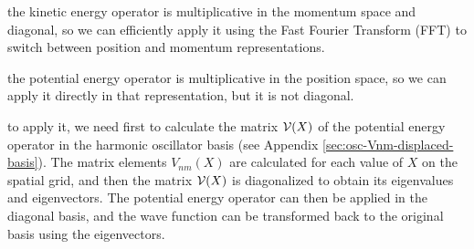the kinetic energy operator is multiplicative in the momentum space and diagonal, so we can efficiently apply it using the Fast Fourier Transform (FFT) to switch between position and momentum representations.

the potential energy operator is multiplicative in the position space, so we can apply it directly in that representation, but it is not diagonal.

to apply it, we need first to calculate the matrix ${\cal V}(X)$ of the potential energy operator in the harmonic oscillator basis (see Appendix \ref{sec:osc-Vnm-displaced-basis}). The matrix elements $V_{nm}(X)$ are calculated for each value of $X$ on the spatial grid, and then the matrix ${\cal V}(X)$ is diagonalized to obtain its eigenvalues and eigenvectors. The potential energy operator can then be applied in the diagonal basis, and the wave function can be transformed back to the original basis using the eigenvectors.

